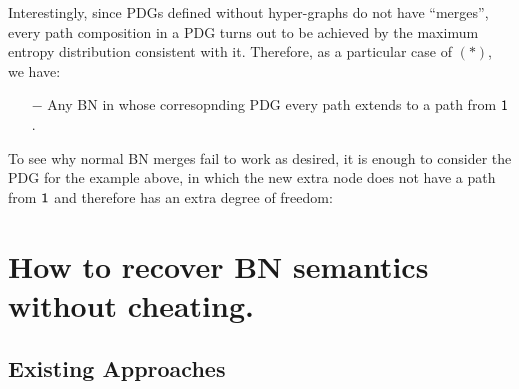 \documentclass{article}
\begin{document}
	Interestingly, since PDGs defined without hyper-graphs do not have ``merges'', every path composition in a PDG turns out to be achieved by the maximum entropy distribution consistent with it. Therefore, as a particular case of  
	$(\boldsymbol\ast)$, we have:
	
	\begin{itemize}[nosep]
		\item[$-$] Any BN in whose corresopnding PDG every path extends to a path from $\sf 1$.
	\end{itemize}

	To see why normal BN merges fail to work as desired, it is enough to consider the PDG for the example above, in which the new extra node does not have a path from $\sf 1$ and therefore has an extra degree of freedom:

	\begin{center}
	\end{center}
		
	\section{How to recover BN semantics without cheating.}
	
	\subsection{Existing Approaches}
\end{document}
